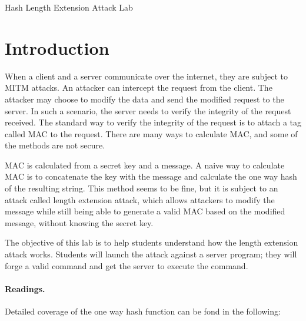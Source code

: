 









\begin{center}
{\LARGE Hash Length Extension Attack Lab}
\end{center}


\setcounter{task}{1}
\newcommand{\tasks} {\bf {\noindent (\arabic{task})} \addtocounter{task}{1} \,}


\section{Introduction}

When a client and a server communicate over the internet, they are subject to MITM attacks.
An attacker can intercept the request from the client. The attacker may choose to modify 
the data and send the modified request to the server. In such a scenario, the server needs 
to verify the integrity of the request received. The standard way to verify the integrity 
of the request is to attach a tag called MAC to the request. There are many ways to 
calculate MAC, and some of the methods are not secure.  


MAC is calculated from a secret key and a message. A naive way to 
calculate MAC is to concatenate the key with the message and
calculate the one way hash of the resulting string. This method seems to be fine, but 
it is subject to an attack called length extension attack, which  
allows attackers to modify the message
while still being able to generate a valid MAC based on the modified message, without knowing the secret key.

The objective of this lab is to help students understand how 
the length extension attack works. Students will launch the 
attack against a server program; they will forge a valid command 
and get the server to execute the command. 



\paragraph{Readings.} Detailed coverage of the one way hash function can be 
fond in the following: 

